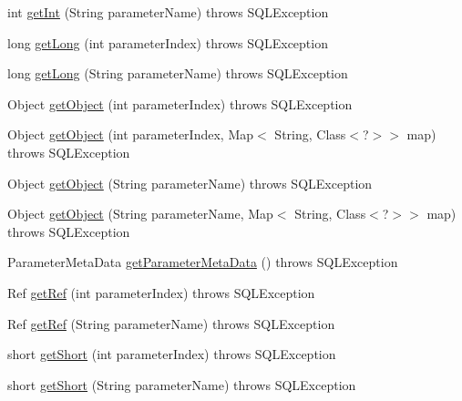 \begin{DoxyCompactItemize}
\item 
int \mbox{\hyperlink{classcom_1_1mysql_1_1cj_1_1jdbc_1_1_callable_statement_a4685a7930f62ecaf6dbb1e0153809238}{get\+Int}} (String parameter\+Name)  throws S\+Q\+L\+Exception 
\item 
long \mbox{\hyperlink{classcom_1_1mysql_1_1cj_1_1jdbc_1_1_callable_statement_a6c377cb8bf737e797f7b1997b1720f20}{get\+Long}} (int parameter\+Index)  throws S\+Q\+L\+Exception 
\item 
long \mbox{\hyperlink{classcom_1_1mysql_1_1cj_1_1jdbc_1_1_callable_statement_a91e4b1905100f823247b0670dfeab198}{get\+Long}} (String parameter\+Name)  throws S\+Q\+L\+Exception 
\item 
Object \mbox{\hyperlink{classcom_1_1mysql_1_1cj_1_1jdbc_1_1_callable_statement_a9f21c0d55e0a2c4361e1d57500a6c06f}{get\+Object}} (int parameter\+Index)  throws S\+Q\+L\+Exception 
\item 
Object \mbox{\hyperlink{classcom_1_1mysql_1_1cj_1_1jdbc_1_1_callable_statement_a97844ead20095c7f99ec8dda55fcb795}{get\+Object}} (int parameter\+Index, Map$<$ String, Class$<$?$>$$>$ map)  throws S\+Q\+L\+Exception 
\item 
Object \mbox{\hyperlink{classcom_1_1mysql_1_1cj_1_1jdbc_1_1_callable_statement_a6166a1c8cd33dbb53750d37513d29365}{get\+Object}} (String parameter\+Name)  throws S\+Q\+L\+Exception 
\item 
Object \mbox{\hyperlink{classcom_1_1mysql_1_1cj_1_1jdbc_1_1_callable_statement_a367ba176bf87e7f1ec648719163ccfe1}{get\+Object}} (String parameter\+Name, Map$<$ String, Class$<$?$>$$>$ map)  throws S\+Q\+L\+Exception 
\item 
Parameter\+Meta\+Data \mbox{\hyperlink{classcom_1_1mysql_1_1cj_1_1jdbc_1_1_callable_statement_a7de827ba1f1043c4f4fcaf93da15305e}{get\+Parameter\+Meta\+Data}} ()  throws S\+Q\+L\+Exception 
\item 
Ref \mbox{\hyperlink{classcom_1_1mysql_1_1cj_1_1jdbc_1_1_callable_statement_a8720b2b1d80bf651acaa37a231a54a2f}{get\+Ref}} (int parameter\+Index)  throws S\+Q\+L\+Exception 
\item 
Ref \mbox{\hyperlink{classcom_1_1mysql_1_1cj_1_1jdbc_1_1_callable_statement_af7a8d26f34cc8e3de6ef0f752a120522}{get\+Ref}} (String parameter\+Name)  throws S\+Q\+L\+Exception 
\item 
short \mbox{\hyperlink{classcom_1_1mysql_1_1cj_1_1jdbc_1_1_callable_statement_a76c1fd1939e74de3c13d31f2be917be5}{get\+Short}} (int parameter\+Index)  throws S\+Q\+L\+Exception 
\item 
short \mbox{\hyperlink{classcom_1_1mysql_1_1cj_1_1jdbc_1_1_callable_statement_a27a1597b2ad871acb0687bd2c5a5ab2e}{get\+Short}} (String parameter\+Name)  throws S\+Q\+L\+Exception 

\end{DoxyCompactItemize}
